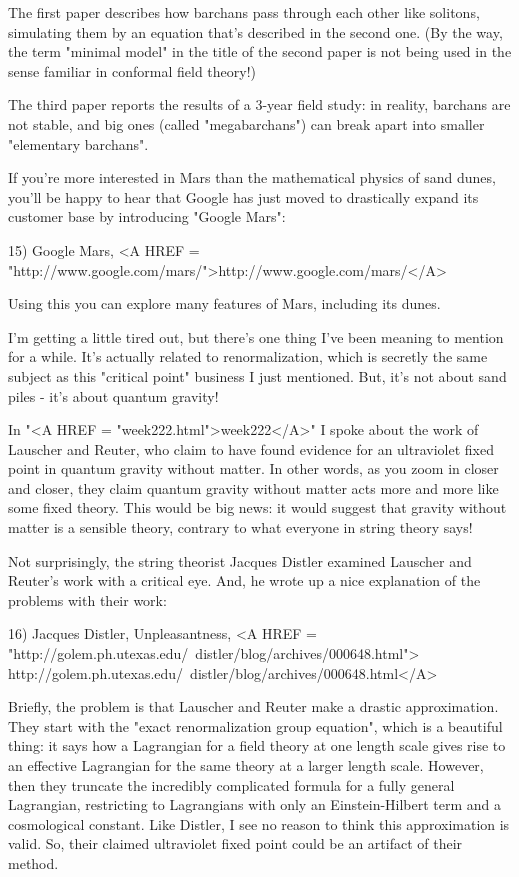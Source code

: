 The first paper describes how barchans pass through each other like
solitons, simulating them by an equation that's described in the second 
one.  (By the way, the term "minimal model" in the title of the 
second 
paper is not being used in the sense familiar in conformal field theory!)

The third paper reports the results of a 3-year field study: in reality,
barchans are not stable, and big ones (called "megabarchans") can 
break apart into smaller "elementary barchans".

If you're more interested in Mars than the mathematical physics of sand 
dunes, you'll be happy to hear that Google has just moved to drastically 
expand its customer base by introducing "Google Mars":

15) Google Mars, <A HREF = "http://www.google.com/mars/">http://www.google.com/mars/</A>

Using this you can explore many features of Mars, including its dunes.

I'm getting a little tired out, but there's one thing I've been
meaning to mention for a while.  It's actually related to renormalization,
which is secretly the same subject as this "critical point" business 
I just mentioned.  But, it's not about sand piles - it's about quantum 
gravity!

In "<A HREF = "week222.html">week222</A>" I spoke about the 
work of Lauscher and Reuter, who claim to 
have found evidence for an ultraviolet fixed point in quantum gravity
without matter.  In other words, as you zoom in closer and closer, they 
claim quantum gravity without matter acts more and more like some fixed
theory.  This would be big news: it would suggest that gravity without 
matter is a sensible theory, contrary to what everyone in string theory 
says!

Not surprisingly, the string theorist Jacques Distler examined Lauscher 
and Reuter's work with a critical eye.  And, he wrote up a nice 
explanation of the problems with their work:

16) Jacques Distler, Unpleasantness,
<A HREF = "http://golem.ph.utexas.edu/~distler/blog/archives/000648.html">
http://golem.ph.utexas.edu/~distler/blog/archives/000648.html</A>

Briefly, the problem is that Lauscher and Reuter make a drastic 
approximation.   They start with the "exact renormalization group 
equation", which is a beautiful thing: it says how a Lagrangian 
for a field theory at one length scale gives rise to an effective 
Lagrangian for the same theory at a larger length scale.   However,
then they truncate the incredibly complicated formula for a fully
general Lagrangian, restricting to Lagrangians with only an 
Einstein-Hilbert term and a cosmological constant.  Like Distler, 
I see no reason to think this approximation is valid.  So, their
claimed ultraviolet fixed point could be an artifact of their method.

